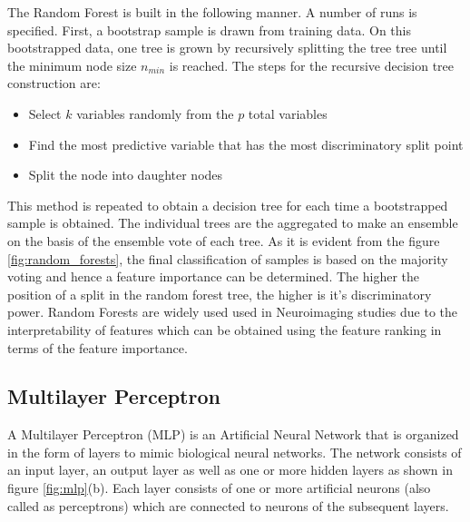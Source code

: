 \documentclass[msthesis.tex]{subfiles}
\begin{document}
The Random Forest is built in the following manner. A number of runs is specified. First, a bootstrap sample is drawn from training data. On this bootstrapped data, one tree is grown by recursively splitting the tree tree until the minimum node size $n_{min}$ is reached. The steps for the recursive decision tree construction are:
\begin{itemize}
    \item Select $k$ variables randomly from the $p$ total variables
    \item Find the most predictive variable that has the most discriminatory split point
    \item Split the node into daughter nodes

\end{itemize}
This method is repeated to obtain a decision tree for each time a bootstrapped sample is obtained. The individual trees are the aggregated to make an ensemble on the basis of the ensemble vote of each tree. As it is evident from the figure \ref{fig:random_forests}, the final classification of samples is based on the majority voting and hence a feature importance can be determined. The higher the position of a split in the random forest tree, the higher is it's discriminatory power. Random Forests are widely used used in Neuroimaging studies due to the interpretability of features which can be obtained using the feature ranking in terms of the feature importance. 



\subsection{Multilayer Perceptron}
A Multilayer Perceptron (MLP) is an Artificial Neural Network that is organized in the form of layers to mimic biological neural networks. The network consists of an input layer, an output layer as well as one or more hidden layers as shown in figure \ref{fig:mlp}(b). Each layer consists of one or more artificial neurons (also called as perceptrons) which are connected to neurons of the subsequent layers. 
\end{document}
